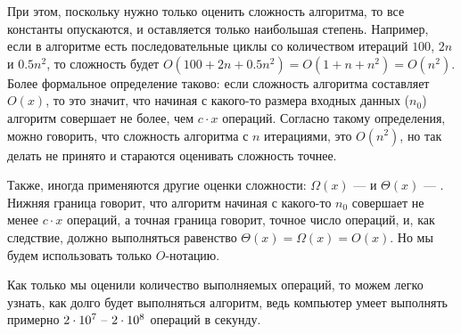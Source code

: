 При этом, поскольку нужно только оценить сложность алгоритма, то все константы опускаются, и оставляется только наибольшая степень. Например, если в алгоритме есть последовательные циклы со количеством итераций $100$, $2n$ и $0.5n^2$, то сложность будет $O(100 + 2n + 0.5n^2) = O(1 + n + n^2) = O(n^2)$. Более формальное определение таково: если сложность алгоритма составляет $O(x)$, то это значит, что начиная с какого-то размера входных данных ($n_0$) алгоритм совершает не более, чем $c \cdot x$ операций. Согласно такому определения, можно говорить, что сложность алгоритма с $n$ итерациями, это $O(n^2)$, но так делать не принято и стараются оценивать сложность точнее.

Также, иногда применяются другие оценки сложности: $\Omega(x)$ —  и $\Theta(x)$ — . Нижняя граница говорит, что алгоритм начиная с какого-то $n_0$ совершает не менее $c \cdot x$ операций, а точная граница говорит, точное число операций, и, как следствие, должно выполняться равенство $\Theta(x) = \Omega(x) = O(x)$. Но мы будем использовать только $O$-нотацию.

Как только мы оценили количество выполняемых операций, то можем легко узнать, как долго будет выполняться алгоритм, ведь компьютер умеет выполнять примерно $2 \cdot 10^7 \text{ -- } 2 \cdot 10^8$ операций в секунду.
